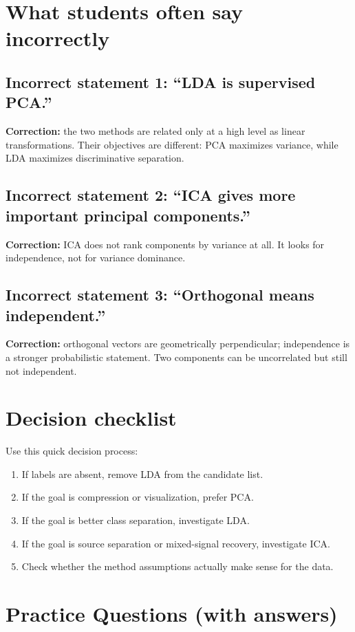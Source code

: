 \documentclass[11pt]{article}
\begin{document}
\section{What students often say incorrectly}
\subsection*{Incorrect statement 1: ``LDA is supervised PCA.''}
\textbf{Correction:} the two methods are related only at a high level as linear transformations. Their objectives are different: PCA maximizes variance, while LDA maximizes discriminative separation.

\subsection*{Incorrect statement 2: ``ICA gives more important principal components.''}
\textbf{Correction:} ICA does not rank components by variance at all. It looks for independence, not for variance dominance.

\subsection*{Incorrect statement 3: ``Orthogonal means independent.''}
\textbf{Correction:} orthogonal vectors are geometrically perpendicular; independence is a stronger probabilistic statement. Two components can be uncorrelated but still not independent.

\section{Decision checklist}
Use this quick decision process:
\begin{enumerate}[leftmargin=*]
  \item If labels are absent, remove LDA from the candidate list.
  \item If the goal is compression or visualization, prefer PCA.
  \item If the goal is better class separation, investigate LDA.
  \item If the goal is source separation or mixed-signal recovery, investigate ICA.
  \item Check whether the method assumptions actually make sense for the data.
\end{enumerate}

\section{Practice Questions (with answers)}
\end{document}
